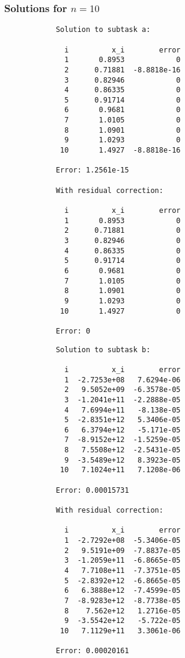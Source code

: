 \documentclass{article}
\begin{document}
	\subsubsection{Solutions for $n = 10$}
	
	\begin{multicols}{2}
		\begin{verbatim}
			Solution to subtask a:

			  i          x_i        error
			  1       0.8953            0
			  2      0.71881  -8.8818e-16
			  3      0.82946            0
			  4      0.86335            0
			  5      0.91714            0
			  6       0.9681            0
			  7       1.0105            0
			  8       1.0901            0
			  9       1.0293            0
			 10       1.4927  -8.8818e-16

			Error: 1.2561e-15

			With residual correction:

			  i          x_i        error
			  1       0.8953            0
			  2      0.71881            0
			  3      0.82946            0
			  4      0.86335            0
			  5      0.91714            0
			  6       0.9681            0
			  7       1.0105            0
			  8       1.0901            0
			  9       1.0293            0
			 10       1.4927            0

			Error: 0
		\end{verbatim}
		\begin{verbatim}
			Solution to subtask b:

			  i          x_i        error
			  1  -2.7253e+08   7.6294e-06
			  2   9.5052e+09  -6.3578e-05
			  3  -1.2041e+11  -2.2888e-05
			  4   7.6994e+11   -8.138e-05
			  5  -2.8351e+12   5.3406e-05
			  6   6.3794e+12   -5.171e-05
			  7  -8.9152e+12  -1.5259e-05
			  8   7.5508e+12  -2.5431e-05
			  9  -3.5489e+12   8.3923e-05
			 10   7.1024e+11   7.1208e-06

			Error: 0.00015731

			With residual correction:

			  i          x_i        error
			  1  -2.7292e+08  -5.3406e-05
			  2   9.5191e+09  -7.8837e-05
			  3  -1.2059e+11  -6.8665e-05
			  4   7.7108e+11  -7.3751e-05
			  5  -2.8392e+12  -6.8665e-05
			  6   6.3888e+12  -7.4599e-05
			  7  -8.9283e+12  -8.7738e-05
			  8    7.562e+12   1.2716e-05
			  9  -3.5542e+12   -5.722e-05
			 10   7.1129e+11   3.3061e-06

			Error: 0.00020161
		\end{verbatim}
	\end{multicols}
	
\end{document}
